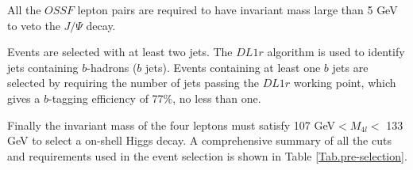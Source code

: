 All the $OSSF$ lepton pairs are required to have invariant mass large than 5 GeV to veto the $J/\Psi$ decay.

Events are selected with at least two jets. The $DL1r$ algorithm is used to identify jets containing $b$-hadrons ($b$ jets). Events containing at least one $b$ jets are selected by requiring the number of jets passing the $DL1r$ working point, which gives a $b$-tagging efficiency of 77\%, no less than one.

Finally the invariant mass of the four leptons must satisfy 107 GeV$<M_{ 4l}<$ 133 GeV to select a on-shell Higgs decay. A comprehensive summary of all the cuts and requirements used in the event selection is shown in Table \ref{Tab.pre-selection}.


